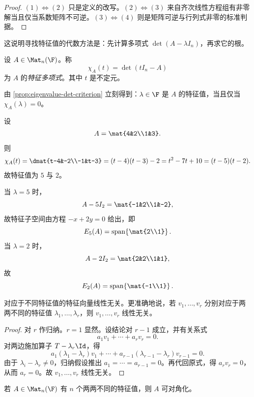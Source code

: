 \begin{proof}
\((1)\Leftrightarrow(2)\) 只是定义的改写。\((2)\Leftrightarrow(3)\) 来自齐次线性方程组有非零解当且仅当系数矩阵不可逆。\((3)\Leftrightarrow(4)\) 则是矩阵可逆与行列式非零的标准判据。
\end{proof}

这说明寻找特征值的代数方法是：先计算多项式 \(\det(A-\lambda I_n)\)，再求它的根。

\begin{definition}
设 \(A\in \Mat_n(\F)\)。称
\[
\chi_A(t)=\det(tI_n-A)
\]
为 \(A\) 的\emph{特征多项式}。其中 \(t\) 是不定元。
\end{definition}

由 \cref{prop:eigenvalue-det-criterion} 立刻得到：\(\lambda\in \F\) 是 \(A\) 的特征值，当且仅当 \(\chi_A(\lambda)=0\)。

\begin{example}
设
\[
A=\mat{4&2\\1&3}.
\]
则
\[
\chi_A(t)=\dmat{t-4&-2\\-1&t-3}=(t-4)(t-3)-2=t^2-7t+10=(t-5)(t-2).
\]
故特征值为 \(5\) 与 \(2\)。

当 \(\lambda=5\) 时，
\[
A-5I_2=\mat{-1&2\\1&-2},
\]
故特征子空间由方程 \(-x+2y=0\) 给出，即
\[
E_5(A)=\operatorname{span}\!\left\{\mat{2\\1}\right\}.
\]
当 \(\lambda=2\) 时，
\[
A-2I_2=\mat{2&2\\1&1},
\]
故
\[
E_2(A)=\operatorname{span}\!\left\{\mat{-1\\1}\right\}.
\]
\end{example}

\begin{lemma}\label{lem:distinct-eigenvectors-li}
对应于不同特征值的特征向量线性无关。更准确地说，若 \(v_1,\dots,v_r\) 分别对应于两两不同的特征值 \(\lambda_1,\dots,\lambda_r\)，则 \(v_1,\dots,v_r\) 线性无关。
\end{lemma}

\begin{proof}
对 \(r\) 作归纳。\(r=1\) 显然。设结论对 \(r-1\) 成立，并有关系式
\[
a_1v_1+\cdots+a_rv_r=0.
\]
对两边施加算子 \(T-\lambda_r\Id\)，得
\[
a_1(\lambda_1-\lambda_r)v_1+\cdots+a_{r-1}(\lambda_{r-1}-\lambda_r)v_{r-1}=0.
\]
由于 \(\lambda_i-\lambda_r\neq 0\)，归纳假设推出 \(a_1=\cdots=a_{r-1}=0\)。再代回原式，得 \(a_rv_r=0\)，从而 \(a_r=0\)。故 \(v_1,\dots,v_r\) 线性无关。
\end{proof}

\begin{corollary}
若 \(A\in \Mat_n(\F)\) 有 \(n\) 个两两不同的特征值，则 \(A\) 可对角化。
\end{corollary}

